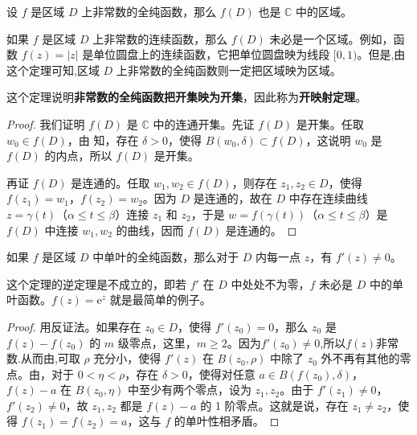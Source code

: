 \documentclass[../../main.tex]{subfiles}%
\begin{document}
\begin{theorem}[开映射定理]\label{theorem:定理4.4.6}
设 \( f \) 是区域 \( D \) 上非常数的全纯函数，那么 \( f(D) \) 也是 \( \mathbb{C} \) 中的区域。
\end{theorem}
\begin{remark}
如果 \( f \) 是区域 \( D \) 上非常数的连续函数，那么 \( f(D) \) 未必是一个区域。例如，函数 \( f(z) = |z| \) 是单位圆盘上的连续函数，它把单位圆盘映为线段 \([0, 1)\)。但是,由这个定理可知,区域 \( D \) 上非常数的全纯函数则一定把区域映为区域。
\end{remark}
\begin{note}
这个定理说明\textbf{非常数的全纯函数把开集映为开集}，因此称为\textbf{开映射定理}。
\end{note}
\begin{proof}

我们证明 \( f(D) \) 是 \( \mathbb{C} \) 中的连通开集。先证 \( f(D) \) 是开集。任取 \( w_0 \in f(D) \)，由 知，存在 \( \delta > 0 \)，使得 \( B(w_0, \delta) \subset f(D) \)，这说明 \( w_0 \) 是 \( f(D) \) 的内点，所以 \( f(D) \) 是开集。

再证 \( f(D) \) 是连通的。任取 \( w_1, w_2 \in f(D) \)，则存在 \( z_1, z_2 \in D \)，使得 \( f(z_1) = w_1 \)，\( f(z_2) = w_2 \)。因为 \( D \) 是连通的，故在 \( D \) 中存在连续曲线 \( z = \gamma(t) \)（\( \alpha \leqslant  t \leqslant  \beta \)）连接 \( z_1 \) 和 \( z_2 \)，于是 \( w = f(\gamma(t)) \)（\( \alpha \leqslant  t \leqslant  \beta \)）是 \( f(D) \) 中连接 \( w_1, w_2 \) 的曲线，因而 \( f(D) \) 是连通的。 

\end{proof}

\begin{theorem}\label{theorem:定理4.4.7}
如果 \( f \) 是区域 \( D \) 中单叶的全纯函数，那么对于 \( D \) 内每一点 \( z \)，有 \( f'(z) \neq 0 \)。
\end{theorem}
\begin{remark}
这个定理的逆定理是不成立的，即若 \( f' \) 在 \( D \) 中处处不为零，\( f \) 未必是 \( D \) 中的单叶函数。\( f(z) = \mathrm{e}^z \) 就是最简单的例子。
\end{remark}
\begin{proof}

用反证法。如果存在 \( z_0 \in D \)，使得 \( f'(z_0) = 0 \)，那么 \( z_0 \) 是 \( f(z) - f(z_0) \) 的 \( m \) 级零点，这里，\( m \geqslant  2 \)。因为$f'(z_0)\ne 0$,所以$f(z)$非常数.从而由,可取 \( \rho \) 充分小，使得 \( f'(z) \) 在 \( B(z_0, \rho) \) 中除了 \( z_0 \) 外不再有其他的零点。由，对于 \( 0 < \eta < \rho \)，存在 \( \delta > 0 \)，使得对任意 \( a \in B(f(z_0), \delta) \)，\( f(z) - a \) 在 \( B(z_0, \eta) \) 中至少有两个零点，设为 \( z_1, z_2 \)。由于 \( f'(z_1) \neq 0 \)，\( f'(z_2) \neq 0 \)，故 \( z_1, z_2 \) 都是 \( f(z) - a \) 的 1 阶零点。这就是说，存在 \( z_1 \neq z_2 \)，使得 \( f(z_1) = f(z_2) = a \)，这与 \( f \) 的单叶性相矛盾。 

\end{proof}
\end{document}
